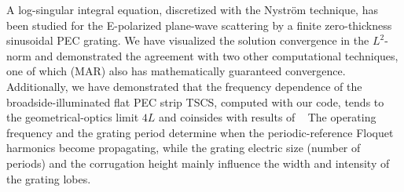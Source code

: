\documentclass[conference]{IEEEtran}
\begin{document}
A log-singular integral equation, discretized with the Nystr\"om
technique, has been studied for the E-polarized plane-wave scattering by a
finite zero-thickness sinusoidal PEC grating.  We have visualized the solution 
convergence in the $L^2$-norm and demonstrated the agreement with two other
computational techniques, one of which (MAR) also has mathematically guaranteed 
convergence. Additionally, we have demonstrated that the frequency dependence of  
the broadside-illuminated flat PEC strip TSCS, computed with our code, tends to 
the geometrical-optics limit $4L$ and coinsides with results of ~\cite{shapoval2011}
The operating frequency and the grating period determine when the periodic-reference 
Floquet harmonics become propagating, while the grating electric size (number of periods)
and the corrugation height mainly influence the width and intensity of the
grating lobes.
\end{document}
